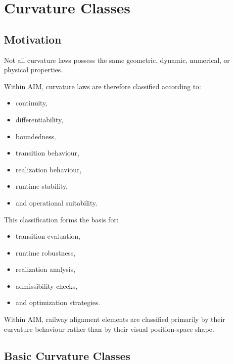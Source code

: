
\chapter{Curvature Classes}

\label{chap:curvature-classes}

\section*{Motivation}

Not all curvature laws possess the same geometric, dynamic, numerical,
or physical properties.

Within AIM, curvature laws are therefore classified according to:
\begin{itemize}
\item continuity,
\item differentiability,
\item boundedness,
\item transition behaviour,
\item realization behaviour,
\item runtime stability,
\item and operational suitability.
\end{itemize}

This classification forms the basis for:
\begin{itemize}
\item transition evaluation,
\item runtime robustness,
\item realization analysis,
\item admissibility checks,
\item and optimization strategies.
\end{itemize}

\begin{principle}
\label{princ:curvature-classification}
Within AIM, railway alignment elements are classified primarily by their
curvature behaviour rather than by their visual position-space shape.
\end{principle}

\section{Basic Curvature Classes}

